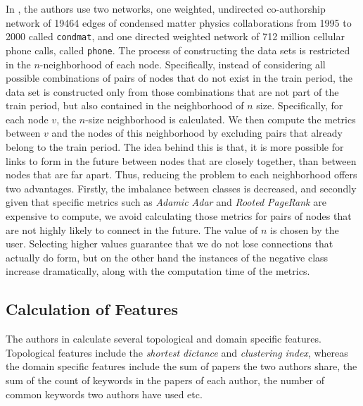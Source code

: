 \documentclass{acm_proc_article-sp}
\begin{document}
In \cite{Lichtenwalter:2010:NPM:1835804.1835837}, the authors use two networks, one weighted, undirected co-authorship network of 19464 edges of condensed matter physics collaborations from 1995 to 2000 called \texttt{condmat}, and one directed weighted network of 712 million cellular phone calls, called \texttt{phone}. The process of constructing the data sets is restricted in the $n$-neighborhood of each node. Specifically, instead of considering all possible combinations of pairs of nodes that do not exist in the train period, the data set is constructed only from those combinations that are not part of the train period, but also contained in the neighborhood of $n$ size. Specifically, for each node $v$, the $n$-size neighborhood is calculated. We then compute the metrics between $v$ and the nodes of this neighborhood by excluding pairs that already belong to the train period. The idea behind this is that, it is more possible for links to form in the future between nodes that are closely together, than between nodes that are far apart. Thus, reducing the problem to each neighborhood offers two advantages. Firstly, the imbalance between classes is decreased, and secondly given that specific metrics such as \textit{Adamic Adar} and \textit{Rooted PageRank} are expensive to compute, we avoid calculating those metrics for pairs of nodes that are not highly likely to connect in the future. The value of $n$ is chosen by the user. Selecting higher values guarantee that we do not lose connections that actually do form, but on the other hand the instances of the negative class increase dramatically, along with the computation time of the metrics.

\subsection{Calculation of Features}

The authors in \cite{Hasan06linkprediction} calculate several topological and domain specific features. Topological features include the \textit{shortest dictance} and \textit{clustering index}, whereas the domain specific features include the sum of papers the two authors share, the sum of the count of keywords in the papers of each author, the number of common keywords two authors have used etc. 
\end{document}
